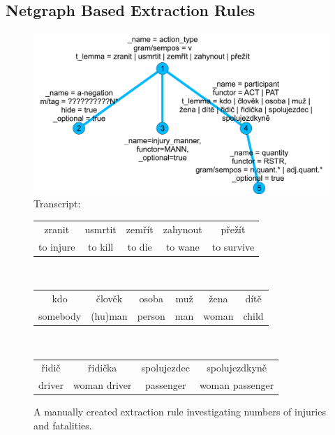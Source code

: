 \subsection{Netgraph Based Extraction Rules} \label{sec:ch50_Netgraph_Based_Extraction_Rules}


\begin{figure}
	\centering
		\includegraphics[width=0.5\hsize]{extract_patern}		
\\Transcript:\\
\begin{tabular}{|c|c|c|c|c|}
\hline
zranit & usmrtit & zemřít & zahynout & přežít\\
to injure & to kill & to die & to wane & to survive\\
\hline
\end{tabular}
\\\begin{tabular}{|c|c|c|c|c|c|}
\hline
kdo & člověk & osoba & muž & žena & dítě\\
somebody & (hu)man & person & man & woman & child\\
\hline
\end{tabular}
\\\begin{tabular}{|c|c|c|c|}
\hline
řidič & řidička & spolujezdec & spolujezdkyně\\
driver & woman driver & passenger & woman passenger\\	
\hline
\end{tabular}		
	\caption{A manually created extraction rule investigating numbers of injuries and fatalities.}
	\label{fig:ch50_extract_patern}
\end{figure}

